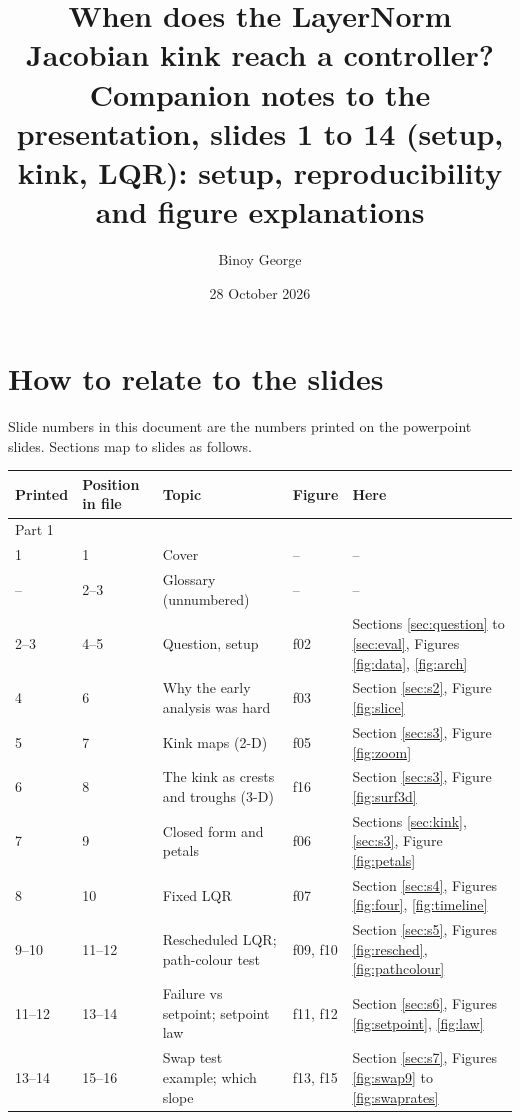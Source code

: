 \documentclass[11pt]{article}
\title{When does the LayerNorm Jacobian kink reach a controller?\\[0.3em]
\large Companion notes to the presentation, slides 1 to 14 (setup, kink, LQR): setup, reproducibility and figure explanations}
\author{Binoy George}
\date{28 October 2026}
\begin{document}
\maketitle
{\setlength{\parskip}{0pt}\tableofcontents}
\newpage

\section{How to relate to the slides}

Slide numbers in this document are the numbers printed on the powerpoint slides. Sections map to slides as follows.

\begin{center}
\footnotesize
\setlength{\tabcolsep}{4pt}
\begin{tabular}{lllll}
\toprule
Printed & Position in file & Topic & Figure & Here \\
\midrule
\multicolumn{5}{l}{Part 1} \\
1 & 1 & Cover & -- & -- \\
-- & 2--3 & Glossary (unnumbered) & -- & -- \\
2--3 & 4--5 & Question, setup & f02 & Sections \ref{sec:question} to \ref{sec:eval}, Figures \ref{fig:data}, \ref{fig:arch} \\
4 & 6 & Why the early analysis was hard & f03 & Section \ref{sec:s2}, Figure \ref{fig:slice} \\
5 & 7 & Kink maps (2-D) & f05 & Section \ref{sec:s3}, Figure \ref{fig:zoom} \\
6 & 8 & The kink as crests and troughs (3-D) & f16 & Section \ref{sec:s3}, Figure \ref{fig:surf3d} \\
7 & 9 & Closed form and petals & f06 & Sections \ref{sec:kink}, \ref{sec:s3}, Figure \ref{fig:petals} \\
8 & 10 & Fixed LQR & f07 & Section \ref{sec:s4}, Figures \ref{fig:four}, \ref{fig:timeline} \\
9--10 & 11--12 & Rescheduled LQR; path-colour test & f09, f10 & Section \ref{sec:s5}, Figures \ref{fig:resched}, \ref{fig:pathcolour} \\
11--12 & 13--14 & Failure vs setpoint; setpoint law & f11, f12 & Section \ref{sec:s6}, Figures \ref{fig:setpoint}, \ref{fig:law} \\
13--14 & 15--16 & Swap test example; which slope & f13, f15 & Section \ref{sec:s7}, Figures \ref{fig:swap9} to \ref{fig:swaprates} \\
\midrule

\end{tabular}
\end{center}
\end{document}
